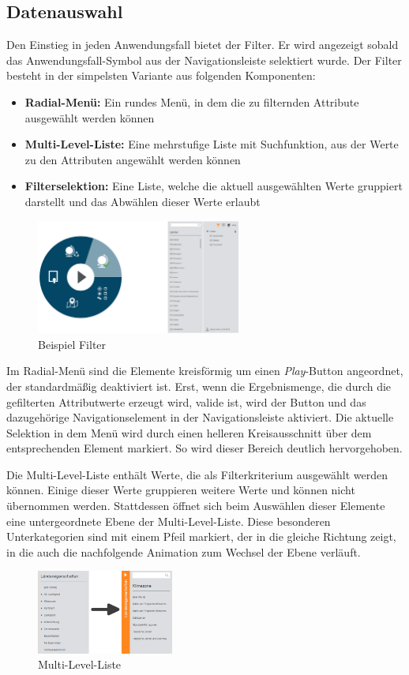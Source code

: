 \subsection{Datenauswahl}
Den Einstieg in jeden Anwendungsfall bietet der Filter. Er wird angezeigt sobald das Anwendungsfall-Symbol aus der Navigationsleiste selektiert wurde. Der Filter besteht in der simpelsten Variante aus folgenden Komponenten:
\begin{itemize}
	\item \textbf{Radial-Menü:} Ein rundes Menü, in dem die zu filternden Attribute ausgewählt werden können
	\item \textbf{Multi-Level-Liste:} Eine mehrstufige Liste mit Suchfunktion, aus der Werte zu den Attributen angewählt werden können
	\item \textbf{Filterselektion:} Eine Liste, welche die aktuell ausgewählten Werte gruppiert darstellt und das Abwählen dieser Werte erlaubt
\end{itemize}
\begin{figure}[H]
 \centering
 \includegraphics[width=0.6\textwidth]{grafiken/filter_short.png}
 \caption{Beispiel Filter}
 \label{fig:filter}
\end{figure}
Im Radial-Menü sind die Elemente kreisförmig um einen \textit{Play}-Button angeordnet, der standardmäßig deaktiviert ist. Erst, wenn die Ergebnismenge, die durch die gefilterten Attributwerte erzeugt wird, valide ist, wird der Button und das dazugehörige Navigationselement in der Navigationsleiste aktiviert. Die aktuelle Selektion in dem Menü wird durch einen helleren Kreisausschnitt über dem entsprechenden Element markiert. So wird dieser Bereich deutlich hervorgehoben.\par
Die Multi-Level-Liste enthält Werte, die als Filterkriterium ausgewählt werden können. Einige dieser Werte gruppieren weitere Werte und können nicht übernommen werden. Stattdessen öffnet sich beim Auswählen dieser Elemente eine untergeordnete Ebene der Multi-Level-Liste. Diese besonderen Unterkategorien sind mit einem Pfeil markiert, der in die gleiche Richtung zeigt, in die auch die nachfolgende Animation zum Wechsel der Ebene verläuft.\par
\begin{figure}[H]
 \centering
 \includegraphics[width=0.4\textwidth]{grafiken/mll_combined.png}
 \caption{Multi-Level-Liste}
 \label{fig:mll}
\end{figure}
